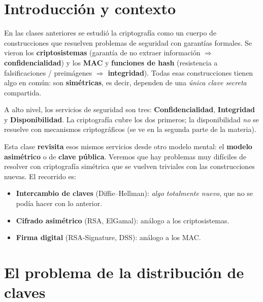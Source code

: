 \documentclass[11pt,a4paper]{article}
\begin{document}
\tableofcontents
\newpage

\section{Introducción y contexto}

En las clases anteriores se estudió la criptografía como un cuerpo de construcciones que
resuelven problemas de seguridad con garantías formales. Se vieron los \textbf{criptosistemas}
(garantía de no extraer información $\Rightarrow$ \textbf{confidencialidad}) y los \textbf{MAC}
y \textbf{funciones de hash} (resistencia a falsificaciones / preimágenes
$\Rightarrow$ \textbf{integridad}). Todas esas construcciones tienen algo en común:
son \textbf{simétricas}, es decir, dependen de una \emph{única clave secreta} compartida.

\begin{slidebox}
A alto nivel, los servicios de seguridad son tres: \textbf{Confidencialidad},
\textbf{Integridad} y \textbf{Disponibilidad}. La criptografía cubre los dos primeros; la
disponibilidad \emph{no} se resuelve con mecanismos criptográficos (se ve en la segunda
parte de la materia).
\end{slidebox}

\medskip
Esta clase \textbf{revisita} esos mismos servicios desde otro modelo mental: el
\textbf{modelo asimétrico} o de \textbf{clave pública}. Veremos que hay problemas muy
difíciles de resolver con criptografía simétrica que se vuelven triviales con las
construcciones nuevas. El recorrido es:
\begin{itemize}[leftmargin=1.4em,itemsep=2pt]
  \item \textbf{Intercambio de claves} (Diffie--Hellman): \emph{algo totalmente nuevo}, que
        no se podía hacer con lo anterior.
  \item \textbf{Cifrado asimétrico} (RSA, ElGamal): análogo a los criptosistemas.
  \item \textbf{Firma digital} (RSA-Signature, DSS): análogo a los MAC.
\end{itemize}

\section{El problema de la distribución de claves}
\end{document}
